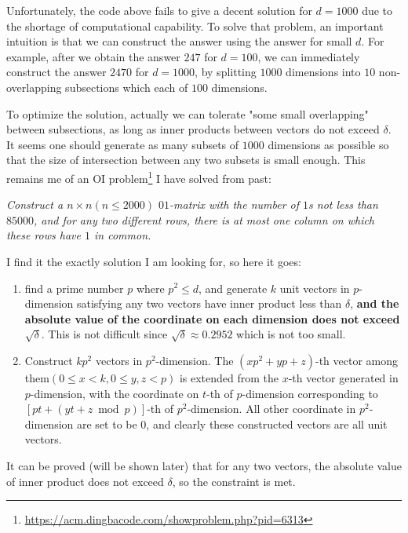 \documentclass[12pt]{article}%
\begin{document}
Unfortunately, the code above fails to give a decent solution for $d = 1000$ due to the shortage of computational capability. To solve that problem, an important intuition is that we can construct the answer using the answer for small $d$. For example, after we obtain the answer $247$ for $d = 100$, we can immediately construct the answer $2470$ for $d = 1000$, by splitting $1000$ dimensions into $10$ non-overlapping subsections which each of $100$ dimensions.

To optimize the solution, actually we can tolerate "some small overlapping" between subsections, as long as inner products between vectors do not exceed $\delta$. It seems one should generate as many subsets of $1000$ dimensions as possible so that the size of intersection between any two subsets is small enough. This remains me of an OI problem\footnote{\url{https://acm.dingbacode.com/showproblem.php?pid=6313}} I have solved from past: 

\begin{center}
	\textit{Construct a $n\times n(n \le 2000)$ $01$-matrix with the number of $1$s not less than $85000$, and for any two different rows, there is at most one column on which these rows have $1$ in common.}
\end{center}

I find it the exactly solution I am looking for, so here it goes:
\begin{enumerate}
	\item find a prime number $p$ where $p^2 \le d$, and generate $k$ unit vectors in $p$-dimension satisfying any two vectors have inner product less than $\delta$, \textbf{and the absolute value of the coordinate on each dimension does not exceed $\sqrt \delta$}. This is not difficult since $\sqrt{\delta} \approx 0.2952$ which is not too small.
	\item Construct $kp^2$ vectors in $p^2$-dimension. The $(xp^2 + yp + z)$-th vector among them$(0 \le x < k, 0 \le y, z < p)$ is extended from the $x$-th vector generated in $p$-dimension, with the coordinate on $t$-th of $p$-dimension corresponding to $[pt + (yt+z \bmod p)]$-th of $p^2$-dimension. All other coordinate in $p^2$-dimension are set to be $0$, and clearly these constructed vectors are all unit vectors.
\end{enumerate}

It can be proved (will be shown later) that for any two vectors, the absolute value of inner product does not exceed $\delta$, so the constraint is met.
\end{document}

